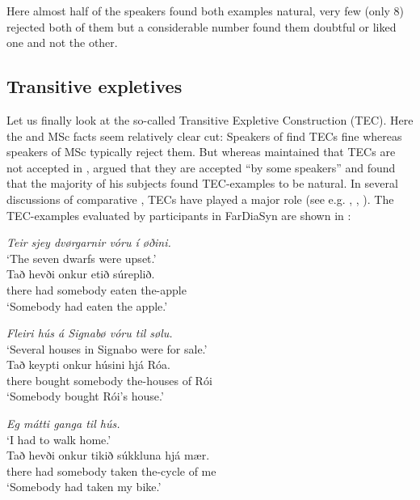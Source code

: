 \documentclass[output=paper]{LSP/langsci}
\begin{document}
Here almost half of the speakers found both examples natural, very few (only 8) rejected both of them but a considerable number found them doubtful or liked one and not the other.

\subsection{Transitive expletives}
Let us finally look at the so-called Transitive Expletive Construction (TEC). Here the  and MSc facts seem relatively clear cut: Speakers of  find TECs fine whereas speakers of MSc typically reject them. But whereas \citet[189]{Vikner1995} maintained that TECs are not accepted in , \citet[282]{Thráinsson2012} argued that they are accepted “by some speakers” and \citet[173]{Angantýsson2011} found that the majority of his subjects found TEC-examples to be natural. In several discussions of comparative , TECs have played a major role (see e.g. \citealt{Bobaljik1998}, \citealt[333–340]{Thráinsson2007}, \citealt{Thrainsson2017}). The TEC-examples evaluated by participants in FarDiaSyn are shown in :

\ea%
    \label{ex:Thrainsson:16}\label{ex:thrainsson:16}
	\ea
	\textit{Teir sjey dvørgarnir vóru í øðini.}\\
	\glt ‘The seven dwarfs were upset.’\\
	\gll       Tað hevði   onkur       etið   súreplið.\\
		      there  had  somebody  eaten  the-apple\\
	\glt       ‘Somebody had eaten the apple.’

\newpage
	\ex \textit{Fleiri hús á Signabø vóru til sølu.}\\
	\glt ‘Several houses in Signabo were for sale.’\\
	\gll     Tað   keypti   onkur     húsini     hjá Róa.\\
			 there  bought  somebody  the-houses  of  Rói\\
	\glt   ‘Somebody bought Rói’s house.’

	\ex \textit{Eg mátti ganga til hús.}\\
	\glt     ‘I had to walk home.’\\
	\gll      Tað   hevði onkur       tikið   súkkluna     hjá mær.\\
		     there  had  somebody  taken  the-cycle   of me\\
	\glt      ‘Somebody had taken my bike.’
 
\end{document}
